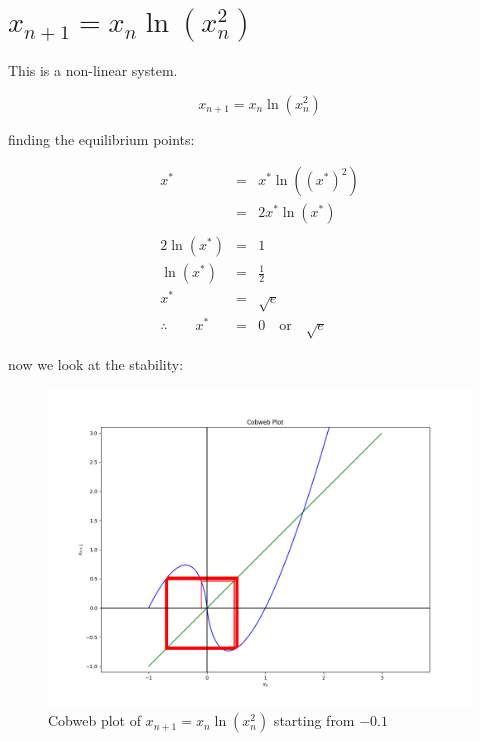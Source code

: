 \documentclass{report}
\begin{document}
\section{$x_{n + 1} = x_n \ln(x_n^2)$}

This is a non-linear system. \bigskip

\[
    x_{n + 1} = x_n \ln(x_n^2)
\]\medskip

finding the equilibrium points: \bigskip



\begin{eqnarray*}
                      x^* & = & x^* \ln((x^*)^2) \\
                          & = & 2 x^* \ln(x^*) \\\\
               2 \ln(x^*) & = & 1 \\
                 \ln(x^*) & = & \frac{1}{2} \\
                      x^* & = & \sqrt{e} \\
    \therefore \qquad x^* & = & 0 \quad \text{or} \quad \sqrt{e}
\end{eqnarray*}\medskip

now we look at the stability: \bigskip

\begin{figure}[h]
	\centering
	\includegraphics[scale = 0.4]{cobweb_04}
	\caption{Cobweb plot of $x_{n + 1} = x_n \ln(x_n^2)$ starting from $-0.1$}
	\label{fig:cobweb_04}
\end{figure}\medskip
\end{document}
